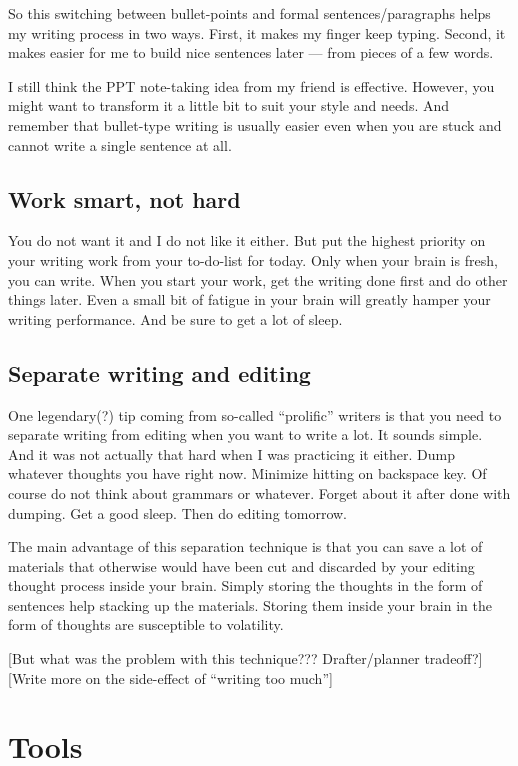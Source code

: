 \documentclass[11pt]{article}
\begin{document}
So this switching between bullet-points and formal sentences/paragraphs helps
my writing process in two ways. First, it makes my finger keep typing. Second,
it makes easier for me to build nice sentences later --- from pieces of a
few words.

I still think the PPT note-taking idea from my friend is effective. However,
you might want to transform it a little bit to suit your style and needs. And
remember that bullet-type writing is usually easier even when you are stuck
and cannot write a single sentence at all.

\subsection{Work smart, not hard}

You do not want it and I do not like it either. But put the highest priority
on your writing work from your to-do-list for today. Only when your brain is
fresh, you can write. When you start your work, get the writing done first and
do other things later. Even a small bit of fatigue in your brain will
greatly hamper your writing performance. And be sure to get a lot of sleep.

\subsection{Separate writing and editing}
One legendary(?) tip coming from so-called ``prolific'' writers is
that you need to separate writing from editing when you want to write
a lot. It sounds simple. And it was not actually that hard when I
was practicing it either. Dump whatever thoughts you have right now.
Minimize hitting on backspace key. Of course do not think about grammars
or whatever. Forget about it after done with dumping. Get a good sleep.
Then do editing tomorrow.

The main advantage of this separation technique is that you can save a lot of
materials that otherwise would have been cut and discarded by your editing
thought process inside your brain. Simply storing the thoughts in the form of
sentences help stacking up the materials.  Storing them inside your brain in
the form of thoughts are susceptible to volatility.

[But what was the problem with this technique??? Drafter/planner tradeoff?]
[Write more on the side-effect of ``writing too much'']

\section{Tools}
\end{document}
